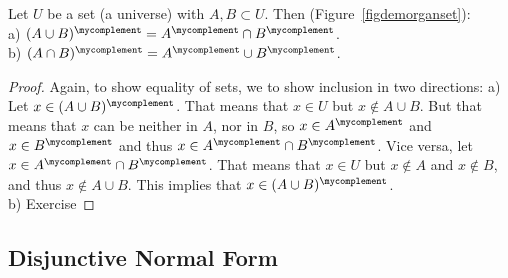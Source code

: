 \begin{thm}
Let $U$ be a set (a universe) with $A,B\subset U$.
Then (Figure~\ref{figdemorganset}):\\
a) $(A\cup B)^\mycomplement=A^\mycomplement\cap B^\mycomplement$.\\
b) $(A\cap B)^\mycomplement=A^\mycomplement\cup B^\mycomplement$.
\end{thm}
\begin{proof}
Again, to show equality of sets, we to show inclusion in two directions:
a) Let $x\in (A\cup B)^\mycomplement$. That means that $x\in U$ but $x\not\in
A\cup B$. But that means that $x$ can be neither in $A$, nor in $B$, so
$x\in A^\mycomplement$ and $x\in B^\mycomplement$ and thus $x\in
A^\mycomplement\cap B^\mycomplement$.
Vice versa, let $x\in A^\mycomplement\cap B^\mycomplement$.
That means that $x\in U$ but $x\not\in A$ and
$x\not\in B$, and thus $x\not\in A\cup B$. This implies that
$x\in(A\cup B)^\mycomplement$.\\
b) Exercise
\end{proof}

\subsection{Disjunctive Normal Form}

